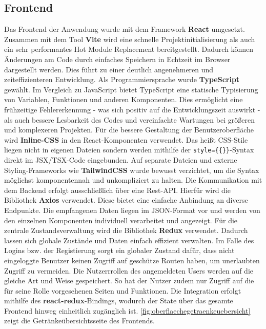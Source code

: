 \documentclass[conference,a4paper]{cs-techrep}
\begin{document}
\subsection{Frontend}
Das Frontend der Anwendung wurde mit dem Framework \textbf{React} umgesetzt. Zusammen mit dem Tool \textbf{Vite} wird eine schnelle Projektinitialisierung als auch ein sehr performantes Hot Module Replacement bereitgestellt. Dadurch können Änderungen am Code durch einfaches Speichern in Echtzeit im Browser dargestellt werden. Dies führt zu einer deutlich angenehmeren und zeiteffizienteren Entwicklung. \newline
Als Programmiersprache wurde \textbf{TypeScript} gewählt. Im Vergleich zu JavaScript bietet TypeScript eine statische Typisierung von Variablen, Funktionen und anderen Komponenten. Dies ermöglicht eine frühzeitige Fehlererkennung - was sich positiv auf die Entwicklungszeit auswirkt - als auch bessere Lesbarkeit des Codes und vereinfachte Wartungen bei größeren und komplexeren Projekten. \newline
Für die bessere Gestaltung der Benutzeroberfläche wird \textbf{Inline-CSS} in den React-Komponenten verwendet. Das heißt CSS-Stile liegen nicht in eigenen Dateien sondern werden mithilfe der \texttt{style=\{\{\}\}}-Syntax direkt im JSX/TSX-Code eingebunden. Auf separate Dateien und externe Styling-Frameworks wie \textbf{TailwindCSS} wurde bewusst verzichtet, um die Syntax möglichst komponentennah und unkompliziert zu halten.	\newline
Die Kommunikation mit dem Backend erfolgt ausschließlich über eine Rest-API. Hierfür wird die Bibliothek \textbf{Axios} verwendet. Diese bietet eine einfache Anbindung an diverse Endpunkte. Die empfangenen Daten liegen im JSON-Format vor und werden von den einzelnen Komponenten individuell verarbeitet und angezeigt. \newline
Für die zentrale Zustandsverwaltung wird die Bibliothek \textbf{Redux} verwendet. Dadurch lassen sich globale Zustände und Daten einfach effizient verwalten. Im Falle des Logins bzw. der Registierung sorgt ein globaler Zustand dafür, dass nicht eingeloggte Benutzer keinen Zugriff auf geschütze Routen haben, um unerlaubten Zugriff zu vermeiden. Die Nutzerrrollen des angemeldeten Users werden auf die gleiche Art und Weise gespeichert. So hat der Nutzer zudem nur Zugriff auf die für seine Rolle vorgesehenen Seiten und Funktionen. Die Integration erfolgt mithilfe des \textbf{react-redux}-Bindings, wodurch der State über das gesamte Frontend hinweg einheitlich zugänglich ist.\newline
\autoref{fig:oberflaechegetraenkeuebersicht} zeigt die Getränkeübersichtsseite des Frontends.
\end{document}
